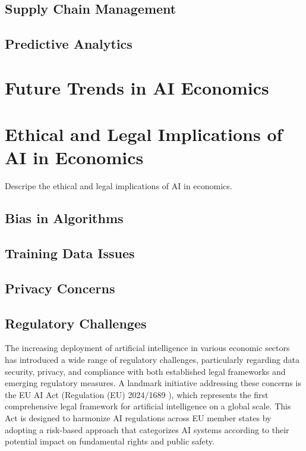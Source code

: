 \subsection{Supply Chain Management}

\subsection{Predictive Analytics}


\section{Future Trends in AI Economics}


\section{Ethical and Legal Implications of AI in Economics}

Descripe the ethical and legal implications of AI in economics.

\subsection{Bias in Algorithms}

\subsection{Training Data Issues}

\subsection{Privacy Concerns}

\subsection{Regulatory Challenges}

The increasing deployment of artificial intelligence in various economic sectors has introduced a wide range of regulatory challenges, particularly regarding data security, privacy, and compliance with both established legal frameworks and emerging regulatory measures. A landmark initiative addressing these concerns is the EU AI Act (Regulation (EU) 2024/1689 \cite{EU-AI-Act-text}), which represents the first comprehensive legal framework for artificial intelligence on a global scale. This Act is designed to harmonize AI regulations across EU member states by adopting a risk-based approach that categorizes AI systems according to their potential impact on fundamental rights and public safety.

